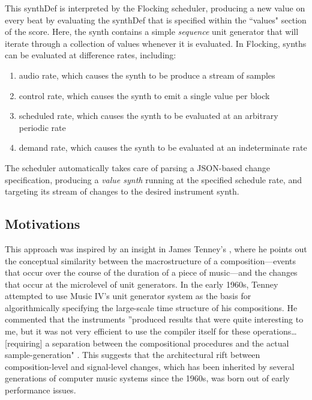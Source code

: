 \documentclass{article}
\begin{document}
This synthDef is interpreted by the Flocking scheduler, producing a new value on every beat by evaluating the synthDef that is specified within the ``values" section of the score. Here, the synth contains a simple {\it sequence} unit generator that will iterate through a collection of values whenever it is evaluated. In Flocking, synths can be evaluated at difference rates, including:

\begin{enumerate}
\item audio rate, which causes the synth to be produce a stream of samples
\item control rate, which causes the synth to emit a single value per block
\item scheduled rate, which causes the synth to be evaluated at an arbitrary periodic rate
\item demand rate, which causes the synth to be evaluated at an indeterminate rate
\end{enumerate}

The scheduler automatically takes care of parsing a JSON-based change specification, producing a {\it value synth} running at the specified schedule rate, and targeting its stream of changes to the desired instrument synth.

\subsection{Motivations}

This approach was inspired by an insight in James Tenney's \cite{tenney1969computer}, where he points out the conceptual similarity between the macrostructure of a composition---events that occur over the course of the duration of a piece of music---and the changes that occur at the microlevel of unit generators. In the early 1960s, Tenney attempted to use Music IV's unit generator system as the basis for algorithmically specifying the large-scale time structure of his compositions. He commented that the instruments ''produced results that were quite interesting to me, but it was not very efficient to use the compiler itself for these operations\ldots [requiring] a separation between the compositional procedures and the actual sample-generation" \cite[p.41--42]{tenney1969computer}. This suggests that the architectural rift between composition-level and signal-level changes, which has been inherited by several generations of computer music systems since the 1960s, was born out of early performance issues.
\end{document}
